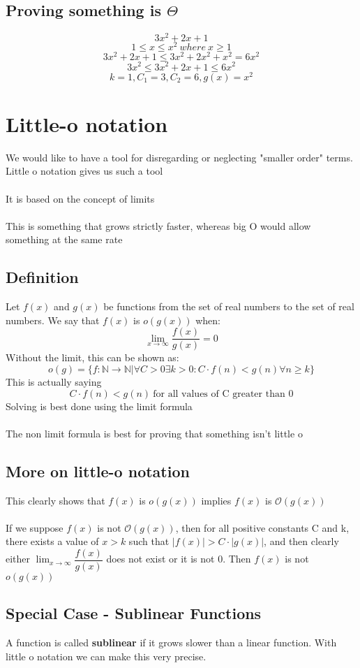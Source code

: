 \documentclass{article}[18pt]
\begin{document}
\subsection{Proving something is $\Theta$}
$$3x^2+2x+1$$
$$1\leqslant x\leqslant x^2 \ where \ x\geqslant 1$$
$$3x^2+2x+1\leqslant 3x^2+2x^2+x^2=6x^2$$
$$3x^2\leqslant 3x^2+2x+1\leqslant 6x^2$$
$$k=1, C_1=3, C_2=6, g(x)=x^2$$

\section{Little-o notation}
We would like to have a tool for disregarding or neglecting "smaller order" terms. Little o notation gives us such a tool\\
\\
It is based on the concept of limits\\
\\
This is something that grows strictly faster, whereas big O would allow something at the same rate
\subsection{Definition}
Let $f(x)$ and $g(x)$ be functions from the set of real numbers to the set of real numbers. We say that $f(x)$ is $o(g(x))$ when:
$$\lim_{x\to\infty} \dfrac{f(x)}{g(x)}=0$$
Without the limit, this can be shown as:
$$o ( g ) = \{ f : \mathbb { N } \rightarrow \mathbb { N } | \forall C > 0 \exists k > 0 : C \cdot f ( n ) < g ( n ) \forall n \geq k \}$$
This is actually saying
$$C\cdot f(n)<g(n)  \ \text{for all values of C greater than 0}$$
Solving is best done using the limit formula\\
\\
The non limit formula is best for proving that something isn't little o

\subsection{More on little-o notation}
This clearly shows that $f(x)$ is $o(g(x))$ implies $f(x)$ is $\mathcal{O}(g(x))$\\
\\
If we suppose $f(x)$ is not $\mathcal{O}(g(x))$, then for all positive constants C and k, there exists a value of $x>k$ such that $|f(x)|>C\cdot |g(x)|$, and then clearly either $\lim_{x\to\infty} \dfrac{f(x)}{g(x)}$ does not exist or it is not 0. Then $f(x)$ is not $o(g(x))$
\subsection{Special Case - Sublinear Functions}
A function is called \textbf{sublinear} if it grows slower than a linear function. With little o notation we can make this very precise.
\end{document}
